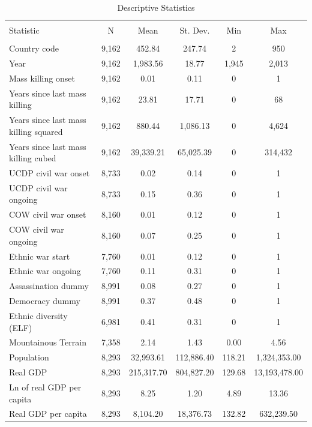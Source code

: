 \begin{table}[!htbp] \centering 
  \caption{Descriptive Statistics} 
  \label{tab:mk-ds} 
\footnotesize 
\begin{tabular}{@{\extracolsep{5pt}}lccccc} 
\\[-1.8ex]\hline 
\hline \\[-1.8ex] 
Statistic & \multicolumn{1}{c}{N} & \multicolumn{1}{c}{Mean} & \multicolumn{1}{c}{St. Dev.} & \multicolumn{1}{c}{Min} & \multicolumn{1}{c}{Max} \\ 
\hline \\[-1.8ex] 
Country code & 9,162 & 452.84 & 247.74 & 2 & 950 \\ 
Year & 9,162 & 1,983.56 & 18.77 & 1,945 & 2,013 \\ 
Mass killing onset & 9,162 & 0.01 & 0.11 & 0 & 1 \\ 
Years since last mass killing & 9,162 & 23.81 & 17.71 & 0 & 68 \\ 
Years since last mass killing squared & 9,162 & 880.44 & 1,086.13 & 0 & 4,624 \\ 
Years since last mass killing cubed & 9,162 & 39,339.21 & 65,025.39 & 0 & 314,432 \\ 
UCDP civil war onset & 8,733 & 0.02 & 0.14 & 0 & 1 \\ 
UCDP civil war ongoing & 8,733 & 0.15 & 0.36 & 0 & 1 \\ 
COW civil war onset & 8,160 & 0.01 & 0.12 & 0 & 1 \\ 
COW civil war ongoing & 8,160 & 0.07 & 0.25 & 0 & 1 \\ 
Ethnic war start & 7,760 & 0.01 & 0.12 & 0 & 1 \\ 
Ethnic war ongoing & 7,760 & 0.11 & 0.31 & 0 & 1 \\ 
Assassination dummy & 8,991 & 0.08 & 0.27 & 0 & 1 \\ 
Democracy dummy & 8,991 & 0.37 & 0.48 & 0 & 1 \\ 
Ethnic diversity (ELF) & 6,981 & 0.41 & 0.31 & 0 & 1 \\ 
Mountainous Terrain & 7,358 & 2.14 & 1.43 & 0.00 & 4.56 \\ 
Population & 8,293 & 32,993.61 & 112,886.40 & 118.21 & 1,324,353.00 \\ 
Real GDP & 8,293 & 215,317.70 & 804,827.20 & 129.68 & 13,193,478.00 \\ 
Ln of real GDP per capita & 8,293 & 8.25 & 1.20 & 4.89 & 13.36 \\ 
Real GDP per capita & 8,293 & 8,104.20 & 18,376.73 & 132.82 & 632,239.50 \\ 

\end{tabular}
\end{table}
